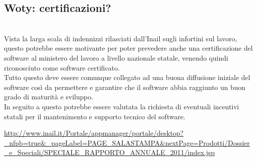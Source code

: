 \subsection{Woty: certificazioni?}
\\



Vista la larga scala di indennizzi rilasciati dall'Inail sugli infortini sul lavoro, questo potrebbe essere motivante per poter prevedere anche una certificazione del software al ministero del lavoro a livello nazionale statale, venendo quindi riconosciuto come software certificato.\\
Tutto questo deve essere comunque collegato ad una buona diffusione iniziale del software così da permettere e garantire che il software abbia raggiunto un buon grado di maturità e sviluppo.\\
In seguito a questo potrebbe essere valutata la richiesta di eventuali incentivi statali per il mantenimento e supporto tecnico del software.



\url{http://www.inail.it/Portale/appmanager/portale/desktop?_nfpb=true&_pageLabel=PAGE_SALASTAMPA&nextPage=Prodotti/Dossier_e_Speciali/SPECIALE_RAPPORTO_ANNUALE_2011/index.jsp}




















\newpage




